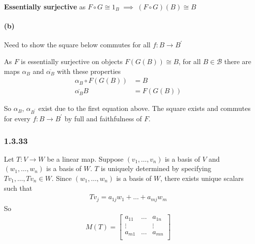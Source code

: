 \documentclass{article}
\begin{document}
\textbf{Essentially surjective} as $F \circ G \cong 1_B \; \implies \; (F\circ G)(B) \cong B$

\paragraph{(b)}

Need to show the square below commutes for all $f\colon B \rightarrow B^\prime$

\begin{center}
\end{center}

As $F$ is essentially surjective on objects $F(G(B)) \cong B$, for all $B \in \mathcal{B}$ there are maps $\alpha_B$ and $\overline{\alpha_B}$ with these properties
\begin{align*}
  \alpha_B \circ F(G(B)) &= B \\
  \overline{\alpha_B} B &=  F(G(B))
\end{align*}

So $\alpha_B$, $\alpha_{B^\prime}$ exist due to the first equation above. The square exists and commutes for every $f\colon B \rightarrow B^{\prime}$ by full and faithfulness of $F$.

\subsubsection*{1.3.33}

Let $T\colon V \rightarrow W$ be a linear map. Suppose $(v_1,\dots,v_n)$ is a basis of $V$ and $(w_1, \dots, w_n)$ is a basis of $W$.
$T$ is uniquely determined by specifying $Tv_1, \dots, Tv_n \in W$. Since $(w_1, \dots, w_n)$ is a basis of $W$, there exists unique scalars such that
\begin{align*}
 Tv_j = a_{1j}w_1 + \dots + a_{mj}w_m
\end{align*}
So
\begin{align*}
  M(T) =
  \begin{bmatrix}
    a_{11} & \dots & a_{1n} \\
    \vdots &  & \vdots \\
    a_{m1} & \dots & a_{mn} \\
  \end{bmatrix}
\end{align*}
\end{document}
